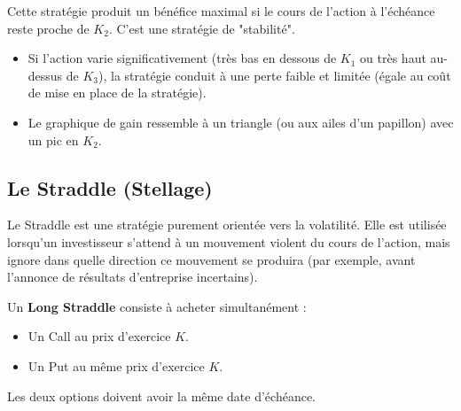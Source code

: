 \begin{intuitionbox}
Cette stratégie produit un bénéfice maximal si le cours de l'action à l'échéance reste proche de $K_2$. C'est une stratégie de "stabilité".
\begin{itemize}
    \item Si l'action varie significativement (très bas en dessous de $K_1$ ou très haut au-dessus de $K_3$), la stratégie conduit à une perte faible et limitée (égale au coût de mise en place de la stratégie).
    \item Le graphique de gain ressemble à un triangle (ou aux ailes d'un papillon) avec un pic en $K_2$.
\end{itemize}
\end{intuitionbox}

\begin{center}
\end{center}

\subsection{Le Straddle (Stellage)}

Le Straddle est une stratégie purement orientée vers la volatilité. Elle est utilisée lorsqu'un investisseur s'attend à un mouvement violent du cours de l'action, mais ignore dans quelle direction ce mouvement se produira (par exemple, avant l'annonce de résultats d'entreprise incertains).

\begin{definitionbox}
Un \textbf{Long Straddle} consiste à acheter simultanément :
\begin{itemize}
    \item Un Call au prix d'exercice $K$.
    \item Un Put au même prix d'exercice $K$.
\end{itemize}
Les deux options doivent avoir la même date d'échéance.
\end{definitionbox}

